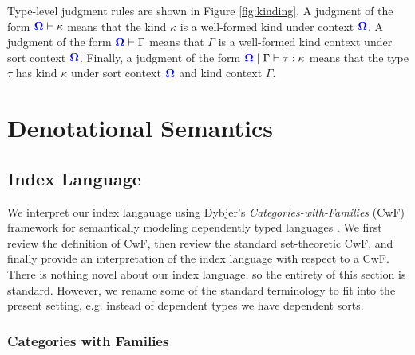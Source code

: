 \documentclass[sigplan,10pt,review,anonymous]{acmart}
\newcommand{\blum}[1]{\mathbf{\color{blue}{#1}}}
\begin{document}
Type-level judgment rules are shown in Figure \ref{fig:kinding}. A judgment of the form $\blum{\Omega} \vdash \kappa$ means that the kind $\kappa$ is a well-formed kind under context $\blum{\Omega}$. A judgment of the form $\blum{\Omega} \vdash \Gamma$ means that $\Gamma$ is a well-formed kind context under sort context $\blum{\Omega}$. Finally, a judgment of the form $\blum{\Omega} \mid \Gamma \vdash \tau : \kappa$ means that the type $\tau$ has kind $\kappa$ under sort context $\blum{\Omega}$ and kind context $\Gamma$.

\section{Denotational Semantics}

\subsection{Index Language}

We interpret our index langauage using Dybjer's \emph{Categories-with-Families} (CwF) framework for semantically modeling dependently typed languages \cite{dybjer1995internal}. We first review the definition of CwF, then review the standard set-theoretic CwF, and finally provide an interpretation of the index language with respect to a CwF. There is nothing novel about our index language, so the entirety of this section is standard. However, we rename some of the standard terminology to fit into the present setting, e.g. instead of dependent types we have dependent sorts.

\subsubsection{Categories with Families}
\end{document}
